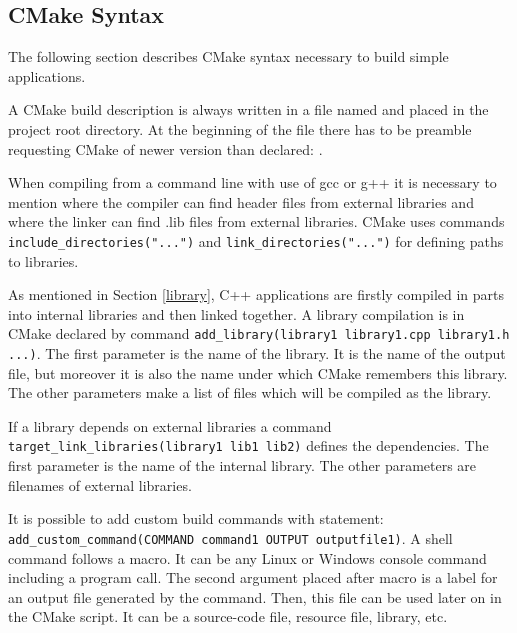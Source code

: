\subsection{CMake Syntax}


The following section describes CMake syntax necessary to build simple applications. 

A CMake build description is always written in a file named  and placed in the project root directory. At the beginning of the file there has to be preamble requesting CMake of newer version than declared: .

When compiling from a command line with use of gcc or g++ it is necessary to mention where the compiler can find header files from external libraries and where the linker can find .lib files from external libraries. CMake uses commands \texttt{include\-\_directories\-("...")} and \texttt{link\-\_directories\-("...")} for defining paths to libraries.

As mentioned in Section \ref{library}, C++ applications are firstly compiled in parts into internal libraries and then linked together. A library compilation is in CMake declared by command \texttt{add\-\_library\-(library1 library1.cpp library1.h ...)}. The first parameter is the name of the library. It is the name of the output file, but moreover it is also the name under which CMake remembers this library. The other parameters make a list of files which will be compiled as the library.

If a library depends on external libraries a command \texttt{target\-\_link\-\_libraries\-(library1 lib1 lib2)} defines the dependencies. The first parameter is the name of the internal library. The other parameters are filenames of external libraries.

It is possible to add custom build commands with statement: {\tt add\-\_custom\-\_command\-(COMMAND command1 OUTPUT outputfile1)}. A shell command follows a  macro. It can be any Linux or Windows console command including a program call. The second argument placed after  macro is a label for an output file generated by the command. Then, this file can be used later on in the CMake script. It can be a source-code file, resource file, library, etc.




